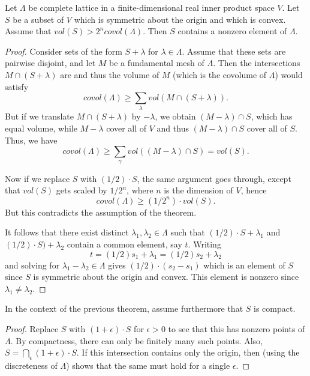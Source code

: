 \begin{theorem}
  Let $\Lambda$ be complete lattice in a finite-dimensional real inner product space $V$.
  Let $S$ be a subset of $V$ which is symmetric about the origin and which is convex.
  Assume that $vol(S) > 2^{n} covol(\Lambda)$.
  Then $S$ contains a nonzero element of $\Lambda$.
\end{theorem}
\begin{proof}
  Consider sets of the form $S + \lambda$ for $\lambda \in \Lambda$.
  Assume that these sets are pairwise disjoint, and let $M$ be a fundamental mesh of $\Lambda$.
  Then the intersections $M \cap (S + \lambda)$ are  and thus the volume of $M$ (which is the covolume of $\Lambda$) would satisfy
  \[ covol(\Lambda) \geq \sum_{\lambda} vol(M \cap (S + \lambda)). \]
  But if we translate $M \cap (S + \lambda)$ by $-\lambda$, we obtain $(M - \lambda) \cap S$, which has equal volume, while $M - \lambda$ cover all of $V$ and thus $(M - \lambda) \cap S$ cover all of $S$.
  Thus, we have
  \[ covol(\Lambda) \geq \sum_{\gamma} vol((M - \lambda) \cap S) = vol(S). \]

  Now if we replace $S$ with $(1/2) \cdot S$, the same argument goes through, except that $vol(S)$ gets scaled by $1/2^{n}$, where $n$ is the dimension of $V$, hence
  \[ covol(\Lambda) \geq (1/2^{n}) \cdot vol(S). \]
  But this contradicts the assumption of the theorem.

  It follows that there exist distinct $\lambda_{1},\lambda_{2} \in \Lambda$ such that $(1/2) \cdot S + \lambda_{1}$ and $(1/2) \cdot S) + \lambda_{2}$ contain a common element, say $t$.
  Writing
  \[ t = (1/2) s_{1} + \lambda_{1} = (1/2) s_{2} + \lambda_{2} \]
  and solving for $\lambda_{1} - \lambda_{2} \in \Lambda$ gives $(1/2) \cdot (s_{2} - s_{1})$ which is an element of $S$ since $S$ is symmetric about the origin and convex.
  This element is nonzero since $\lambda_{1} \neq \lambda_{2}$.
\end{proof}

\begin{theorem}[A variant]
  In the context of the previous theorem, assume furthermore that $S$ is compact.
\end{theorem}
\begin{proof}
  Replace $S$ with $(1 + \epsilon) \cdot S$ for $\epsilon > 0$ to see that this has nonzero points of $\Lambda$.
  By compactness, there can only be finitely many such points.
  Also, $S = \bigcap_{\epsilon} (1 + \epsilon) \cdot S$.
  If this intersection contains only the origin, then (using the discreteness of $\Lambda$) shows that the same must hold for a single $\epsilon$.
\end{proof}

